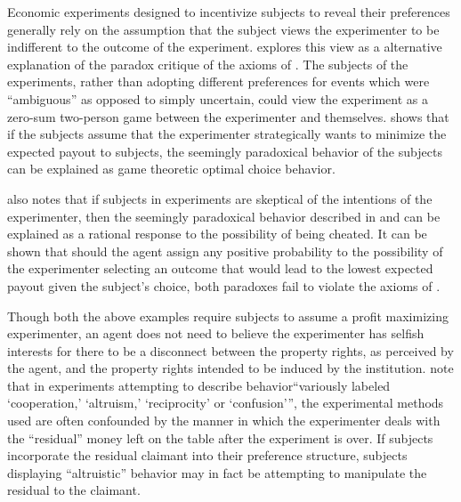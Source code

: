\documentclass[11pt,a4paper]{report}
\begin{document}
Economic experiments designed to incentivize subjects to reveal their preferences generally rely on the assumption that the subject views the experimenter to be indifferent to the outcome of the experiment.
\textcite{Schneeweiss1973} explores this view as a alternative explanation of the \textcite{Ellsberg1961} paradox critique of the axioms of \textcite{Savage1954}.
The subjects of the \textcite{Ellsberg1961} experiments, rather than adopting different preferences for events which were \enquote{ambiguous} as opposed to simply uncertain, could view the experiment as a zero-sum two-person game between the experimenter and themselves.
\textcite{Schneeweiss1973} shows that if the subjects assume that the experimenter strategically wants to minimize the expected payout to subjects, the seemingly paradoxical behavior of the subjects can be explained as game theoretic optimal choice behavior.

\textcite{Kadane1992} also notes that if subjects in experiments are skeptical of the intentions of the experimenter, then the seemingly paradoxical behavior described in \textcite{Ellsberg1961} and \textcite{Allais1953} can be explained as a rational response to the possibility of being cheated.
It can be shown that should the agent assign any positive probability to the possibility of the experimenter selecting an outcome that would lead to the lowest expected payout given the subject's choice, both paradoxes fail to violate the axioms of \textcite{Savage1954}.

Though both the above examples require subjects to assume a profit maximizing experimenter, an agent does not need to believe the experimenter has selfish interests for there to be a disconnect between the property rights, as perceived by the agent, and the property rights intended to be induced by the institution.
\textcite[178]{Harrison2006} note that in experiments attempting to describe behavior\enquote{variously labeled \enquote{cooperation,} \enquote{altruism,} \enquote{reciprocity} or \enquote{confusion}}, the experimental methods used are often confounded by the manner in which the experimenter deals with the \enquote{residual} money left on the table after the experiment is over.
If subjects incorporate the residual claimant into their preference structure, subjects displaying \enquote{altruistic} behavior may in fact be attempting to manipulate the residual to the claimant.
\end{document}
